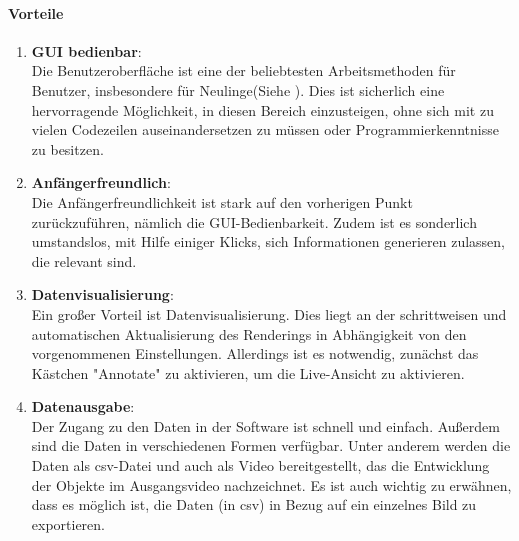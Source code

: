 	\paragraph{Vorteile}
		\begin{enumerate}
    			\item \textbf{GUI bedienbar}: \\
				Die Benutzeroberfläche ist eine der beliebtesten Arbeitsmethoden für Benutzer, insbesondere für Neulinge(Siehe \cite{hertzum1996browsing}). Dies ist sicherlich eine hervorragende Möglichkeit, in diesen Bereich einzusteigen, ohne sich mit zu vielen Codezeilen auseinandersetzen zu müssen oder Programmierkenntnisse zu besitzen.
				
    			\item \textbf{Anfängerfreundlich}:\\
				Die Anfängerfreundlichkeit ist stark auf den vorherigen Punkt zurückzuführen, nämlich die GUI-Bedienbarkeit. Zudem ist es sonderlich umstandslos, mit Hilfe einiger Klicks, sich Informationen generieren zulassen, die relevant sind.    
				
    			\item \textbf{Datenvisualisierung}:\\
    			Ein großer Vorteil ist Datenvisualisierung. Dies liegt an der schrittweisen und automatischen Aktualisierung des Renderings in Abhängigkeit von den vorgenommenen Einstellungen. Allerdings ist es notwendig, zunächst das Kästchen "Annotate" zu aktivieren, um die Live-Ansicht zu aktivieren.
    			
    			\item \textbf{Datenausgabe}:\\
 				Der Zugang zu den Daten in der Software ist schnell und einfach. Außerdem sind die Daten in verschiedenen Formen verfügbar. Unter anderem werden die Daten als csv-Datei und auch als Video bereitgestellt, das die Entwicklung der Objekte im Ausgangsvideo nachzeichnet. 
Es ist auch wichtig zu erwähnen, dass es möglich ist, die Daten (in csv) in Bezug auf ein einzelnes Bild zu exportieren.
		\end{enumerate}
		
